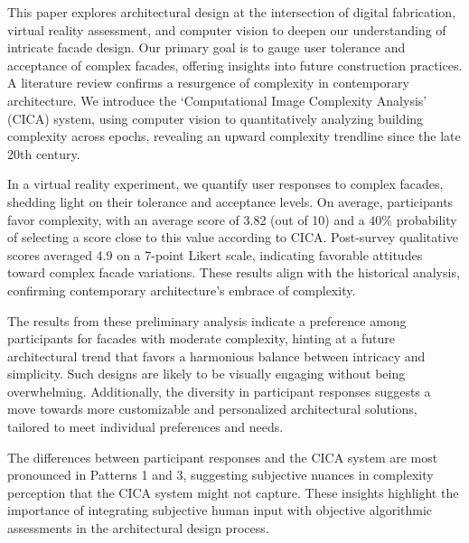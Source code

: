 


This paper explores architectural design at the intersection of digital fabrication, virtual reality assessment, and computer vision to deepen our understanding of intricate facade design.
Our primary goal is to gauge user tolerance and acceptance of complex facades, offering insights into future construction practices.
A literature review confirms a resurgence of complexity in contemporary architecture.
We introduce the `Computational Image Complexity Analysis' (CICA) system, using computer vision to quantitatively analyzing building complexity across epochs, revealing an upward complexity trendline since the late 20th century.

In a virtual reality experiment, we quantify user responses to complex facades, shedding light on their tolerance and acceptance levels.
On average, participants favor complexity, with an average score of 3.82 (out of 10) and a \(40\%\) probability of selecting a score close to this value according to CICA.
Post-survey qualitative scores averaged 4.9 on a 7-point Likert scale, indicating favorable attitudes toward complex facade variations.
These results align with the historical analysis, confirming contemporary architecture's embrace of complexity.


The results from these preliminary analysis indicate a preference among participants for facades with moderate complexity, hinting at a future architectural trend that favors a harmonious balance between intricacy and simplicity.
Such designs are likely to be visually engaging without being overwhelming.
Additionally, the diversity in participant responses suggests a move towards more customizable and personalized architectural solutions, tailored to meet individual preferences and needs.

The differences between participant responses and the CICA system are most pronounced in Patterns 1 and 3, suggesting subjective nuances in complexity perception that the CICA system might not capture.
These insights highlight the importance of integrating subjective human input with objective algorithmic assessments in the architectural design process.

